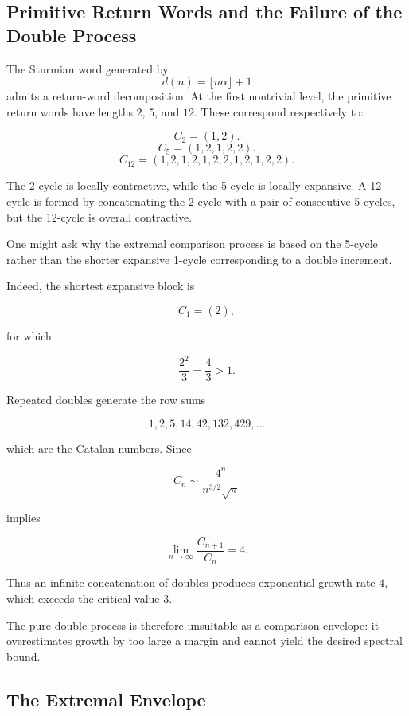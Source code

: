 \documentclass[12pt, oneside]{article}
\numberwithin{equation}{section}
\theoremstyle{definition}
\theoremstyle{plain}
\theoremstyle{remark}
\begin{document}
\subsection{Primitive Return Words and the Failure of the Double Process}

The Sturmian word generated by
\[
d(n)=\lfloor n\alpha\rfloor+1
\]
admits a return-word decomposition.  At the first nontrivial level, the primitive
return words have lengths $2$, $5$, and $12$. These correspond respectively to:

\[
C_2=(1,2).
\]
\[
C_5=(1,2,1,2,2).
\]
\[
C_{12}=(1,2,1,2,1,2,2,1,2,1,2,2).
\]

The 2-cycle is locally contractive, while the 5-cycle is locally expansive. A 12-cycle
is formed by concatenating the 2-cycle with a pair of consecutive 5-cycles, but the 
12-cycle is overall contractive.

One might ask why the extremal comparison process is based on the
5-cycle rather than the shorter expansive 1-cycle corresponding to a
double increment.

Indeed, the shortest expansive block is

\[
C_1=(2),
\]

for which

\[
\frac{2^2}{3} = \frac43 > 1.
\]

Repeated doubles generate the row sums

\[
1,2,5,14,42,132,429,\ldots
\]

which are the Catalan numbers.
Since

\[
C_n
\sim
\frac{4^n}{n^{3/2}\sqrt{\pi}}
\]

implies

\[
\lim_{n\to\infty}
\frac{C_{n+1}}{C_n}
=
4.
\]

Thus an infinite concatenation of doubles produces exponential growth
rate \(4\), which exceeds the critical value \(3\).

The pure-double process is therefore unsuitable as a comparison
envelope: it overestimates growth by too large a margin and cannot
yield the desired spectral bound.

\subsection{The Extremal Envelope}


\end{document}
